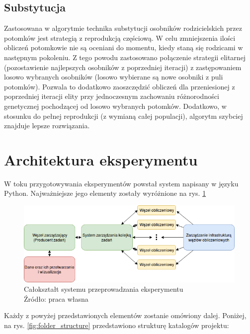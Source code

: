 \subsection{Substytucja}
Zastosowana w algorytmie technika substytucji osobników rodzicielskich przez potomków jest strategią z reprodukcją częściową.
W celu zmniejszenia ilości obliczeń potomkowie nie są oceniani do momentu, kiedy staną się rodzicami w następnym pokoleniu.
Z tego powodu zastosowano połączenie strategii elitarnej (pozostawienie najlepszych osobników z poprzedniej iteracji) z zastępowaniem losowo wybranych osobników (losowo wybierane są nowe osobniki z puli potomków).
Pozwala to dodatkowo zaoszczędzić obliczeń dla przeniesionej z poprzedniej iteracji elity przy jednoczesnym zachowaniu różnorodności genetycznej pochodzącej od losowo wybranych potomków.
Dodatkowo, w stosunku do pełnej reprodukcji (z wymianą całej populacji), algorytm szybciej znajduje lepsze rozwiązania.

\section{Architektura eksperymentu}
W toku przygotowywania eksperymentów powstał system napisany w języku Python\cite{CS-R9526}.
Najważniejsze jego elementy zostały wyróżnione na rys. \ref{fig:system_overview}

\begin{figure}[h!tb]
	 \centering
	 \includegraphics[width = 1.0\linewidth]{img/system_overview}
	 \caption{Całokształt systemu przeprowadzania eksperymentu \\
              Źródło: praca własna}
	 \label{fig:system_overview}
\end{figure}

Każdy z powyżej przedstawionych elementów zostanie omówiony dalej.
Poniżej, na rys. \ref{fig:folder_structure} przedstawiono strukturę katalogów projektu:

